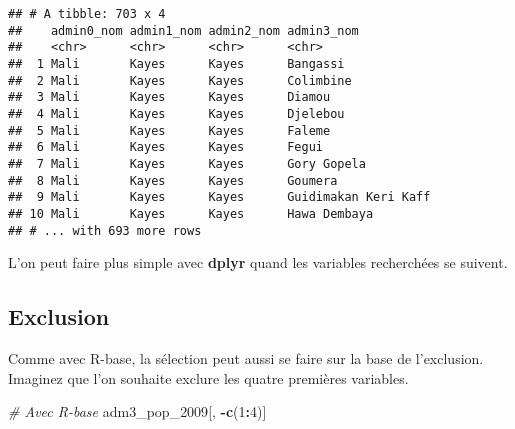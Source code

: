 \documentclass[]{book}
\newenvironment{Shaded}{\begin{snugshade}}{\end{snugshade}}
\newcommand{\KeywordTok}[1]{\textcolor[rgb]{0.13,0.29,0.53}{\textbf{#1}}}
\newcommand{\DecValTok}[1]{\textcolor[rgb]{0.00,0.00,0.81}{#1}}
\newcommand{\StringTok}[1]{\textcolor[rgb]{0.31,0.60,0.02}{#1}}
\newcommand{\CommentTok}[1]{\textcolor[rgb]{0.56,0.35,0.01}{\textit{#1}}}
\newcommand{\OperatorTok}[1]{\textcolor[rgb]{0.81,0.36,0.00}{\textbf{#1}}}
\newcommand{\NormalTok}[1]{#1}
\begin{document}
\begin{Shaded}
\end{Shaded}

\begin{verbatim}
## # A tibble: 703 x 4
##    admin0_nom admin1_nom admin2_nom admin3_nom          
##    <chr>      <chr>      <chr>      <chr>               
##  1 Mali       Kayes      Kayes      Bangassi            
##  2 Mali       Kayes      Kayes      Colimbine           
##  3 Mali       Kayes      Kayes      Diamou              
##  4 Mali       Kayes      Kayes      Djelebou            
##  5 Mali       Kayes      Kayes      Faleme              
##  6 Mali       Kayes      Kayes      Fegui               
##  7 Mali       Kayes      Kayes      Gory Gopela         
##  8 Mali       Kayes      Kayes      Goumera             
##  9 Mali       Kayes      Kayes      Guidimakan Keri Kaff
## 10 Mali       Kayes      Kayes      Hawa Dembaya        
## # ... with 693 more rows
\end{verbatim}

L'on peut faire plus simple avec \textbf{dplyr} quand les variables
recherchées se suivent.

\begin{Shaded}
\end{Shaded}

\subsection{Exclusion}\label{exclusion}

Comme avec R-base, la sélection peut aussi se faire sur la base de
l'exclusion. Imaginez que l'on souhaite exclure les quatre premières
variables.

\begin{Shaded}
\begin{Highlighting}[]
\CommentTok{# Avec R-base}
\NormalTok{adm3_pop_}\DecValTok{2009}\NormalTok{[, }\OperatorTok{-}\KeywordTok{c}\NormalTok{(}\DecValTok{1}\OperatorTok{:}\DecValTok{4}\NormalTok{)]}
\end{Highlighting}
\end{Shaded}
\end{document}

